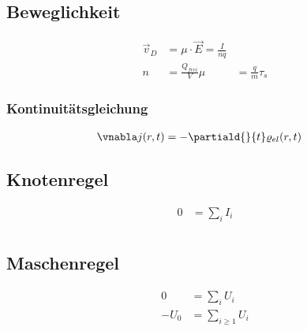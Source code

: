 \documentclass[11pt,letterpaper]{article}
\begin{document}
\subsection{Beweglichkeit}
\begin{align*}
    \vec v_D &= \mu \cdot \vec E = \frac{I}{n q}\\ %
    n &= \frac{Q_{frei}}{V}
    \mu &= \frac{ q }{m } \tau_s %
\end{align*}

\subsubsection{Kontinuitätsgleichung}
\begin{align*}
    \vnabla j(r,t) &= - \partiald{}{t} \varrho_{el}(r,t)
\end{align*}

\subsection{Knotenregel}
\begin{align*}
    0 &= \sum_i I_i\\
\end{align*}

\subsection{Maschenregel}
\begin{align*}
    0 &= \sum_i U_i\\
    -U_0 &= \sum_{i\ge1} U_i
\end{align*}
 
\end{document}
